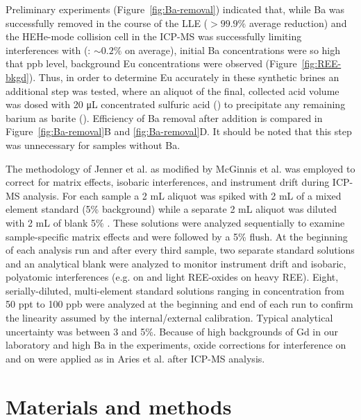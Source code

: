 Preliminary experiments (Figure~\ref{fig:Ba-removal}) indicated that, while Ba was successfully removed in the course of the LLE ($>99.9\%$ average reduction) and the HEHe-mode collision cell in the ICP-MS was successfully limiting  interferences with  (: $\sim0.2\%$ on average), initial Ba concentrations were so high that ppb level, background Eu concentrations were observed (Figure~\ref{fig:REE-bkgd}).
Thus, in order to determine Eu accurately in these synthetic brines an additional step was tested, where an aliquot of the final, collected acid volume was dosed with 20 \si{\uL} concentrated sulfuric acid () to precipitate any remaining barium as barite ().
Efficiency of Ba removal after  addition is compared in Figure~\ref{fig:Ba-removal}B and \ref{fig:Ba-removal}D.
It should be noted that this step was unnecessary for samples without Ba.

The methodology of Jenner et al. \citep{Jenner_CG_1990} as modified by McGinnis et al. \citep{McGinnis_GN_1997} was employed to correct for matrix effects, isobaric interferences, and instrument drift during ICP-MS analysis.
For each sample a 2 mL aliquot was spiked with 2 mL of a mixed element standard (5\%  background) while a separate 2 mL aliquot was diluted with 2 mL of blank 5\% .
These solutions were analyzed sequentially to examine sample-specific matrix effects and were followed by a 5\%  flush.
At the beginning of each analysis run and after every third sample, two separate standard solutions and an analytical blank were analyzed to monitor instrument drift and isobaric, polyatomic interferences (e.g.  on  and light REE-oxides on heavy REE).
Eight, serially-diluted, multi-element standard solutions ranging in concentration from 50 ppt to 100 ppb were analyzed at the beginning and end of each run to confirm the linearity assumed by the internal/external calibration.
Typical analytical uncertainty was between 3 and 5\%.
Because of high backgrounds of Gd in our laboratory and high Ba in the experiments, oxide corrections for  interference on  and  on  were applied as in Aries et al. \citep{Aries_GN_2000} after ICP-MS analysis.

\section{Materials and methods}\label{sec:MnM}

